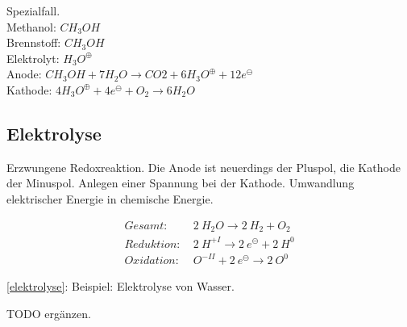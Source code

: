 Spezialfall.\\

Methanol: $CH_3OH$\\

Brennstoff: $CH_3OH$\\

Elektrolyt: $H_3O^\oplus$\\

Anode: $CH_3OH + 7 H_2O \rightarrow CO2 + 6 H_3O^\oplus + 12 e^\ominus$\\

Kathode: $4 H_3O^\oplus + 4e^\ominus + O_2 \rightarrow 6 H_2O$


\subsection{Elektrolyse}

Erzwungene Redoxreaktion. Die Anode ist neuerdings der Pluspol, die Kathode der Minuspol. Anlegen einer Spannung bei der Kathode. Umwandlung elektrischer Energie in chemische Energie.

{\large
	\begin{equation}
		\label{elektrolyse}
		\begin{split}
			Gesamt:\ &2\ H_2O \rightarrow 2\ H_2 + O_2 \\
			Reduktion:\ &2\ H^{+I} \rightarrow 2\ e^\ominus + 2\ H^0 \\
			Oxidation:\ &O^{-II} + 2\ e^\ominus \rightarrow 2\ O^0
		\end{split}
	\end{equation}
}

\ref{elektrolyse}: Beispiel: Elektrolyse von Wasser. \\

\begin{definition}[Galvanisieren]
	TODO ergänzen.
\end{definition}
